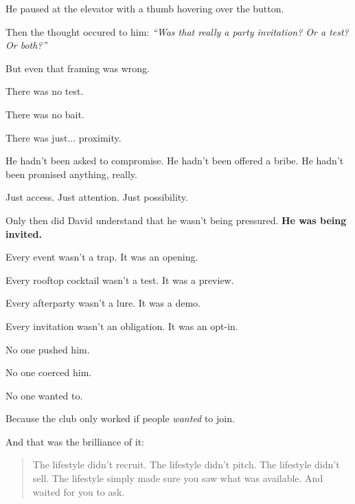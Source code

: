 He paused at the elevator with a thumb hovering over the button.

Then the thought occured to him: \textit{``Was that really a party invitation? Or a test? Or both?''}

But even that framing was wrong.

There was no test.

There was no bait.

There was just... proximity.

He hadn’t been asked to compromise.
He hadn’t been offered a bribe.
He hadn’t been promised anything, really.

Just access.
Just attention.
Just possibility.

Only then did David understand that he wasn't being pressured. \textbf{He was being invited.}

Every event wasn’t a trap. It was an opening.

Every rooftop cocktail wasn’t a test. It was a preview.  

Every afterparty wasn’t a lure. It was a demo.  

Every invitation wasn’t an obligation. It was an opt-in.

No one pushed him. 

No one coerced him. 

No one wanted to. 

Because the club only worked if people \textit{wanted} to join.

And that was the brilliance of it:

\begin{quote}
The lifestyle didn’t recruit.  
The lifestyle didn’t pitch.  
The lifestyle didn’t sell.  
The lifestyle simply made sure you saw what was available.  
And waited for you to ask.
\end{quote}

